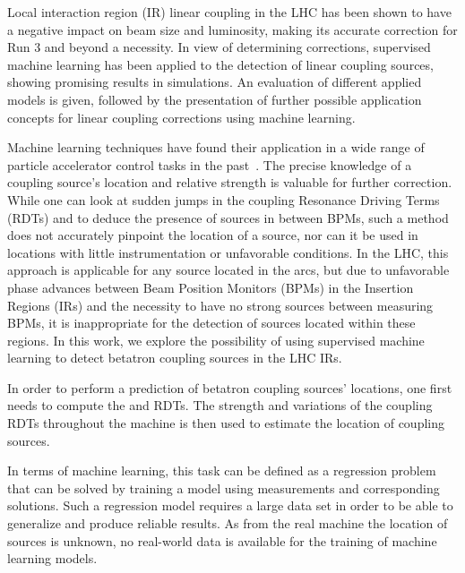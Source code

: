 Local interaction region (IR) linear coupling in the LHC has been shown to have a negative impact on beam size and luminosity, making its accurate correction for Run 3 and beyond a necessity.
In view of determining corrections, supervised machine learning has been applied to the detection of linear coupling sources, showing promising results in simulations.
An evaluation of different applied models is given, followed by the presentation of further possible application concepts for linear coupling corrections using machine learning.

Machine learning techniques have found their application in a wide range of particle accelerator control tasks in the past~\cite{elena_fol_ipac2018, edelen_neural_networks_for_control, bozoki_epac1994, meier_nn_correction_ipac2012, kijima_epac92, fol_faulty_bpms, folSupervisedLearningbasedReconstruction2021}.
The precise knowledge of a coupling source's location and relative strength is valuable for further correction.
While one can look at sudden jumps in the coupling Resonance Driving Terms (RDTs) \foneohone and \foneohoneoh to deduce the presence of sources in between BPMs, such a method does not accurately pinpoint the location of a source, nor can it be used in locations with little instrumentation or unfavorable conditions.
In the LHC, this approach is applicable for any source located in the arcs, but due to unfavorable phase advances between Beam Position Monitors (BPMs) in the Insertion Regions (IRs) and the necessity to have no strong sources between measuring BPMs, it is inappropriate for the detection of sources located within these regions.
In this work, we explore the possibility of using supervised machine learning to detect betatron coupling sources in the LHC IRs.

In order to perform a prediction of betatron coupling sources' locations, one first needs to compute the \foneohone and \foneohoneoh RDTs.
The strength and variations of the coupling RDTs throughout the machine is then used to estimate the location of coupling sources.

In terms of machine learning, this task can be defined as a regression problem that can be solved by training a model using measurements and corresponding solutions.
Such a regression model requires a large data set in order to be able to generalize and produce reliable results.
As from the real machine the location of sources is unknown, no real-world data is available for the training of machine learning models.

